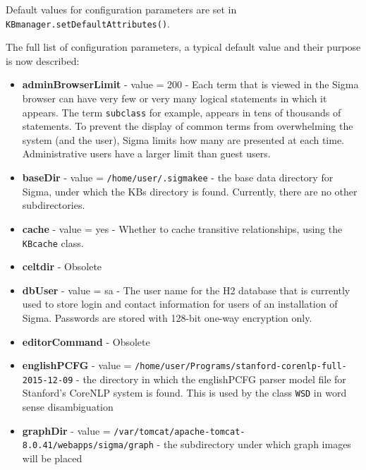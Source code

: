 \documentclass{book}
\begin{document}
\begin{sloppypar}
Default values for configuration parameters are set in 
\texttt{KBmanager.setDefaultAttributes()}.
\end{sloppypar}

The full list of configuration parameters, a typical default value and their
purpose is now described:

\begin{itemize}

\item \textbf{adminBrowserLimit} - value = 200 - Each term that is viewed in the
Sigma browser can have very few or very many logical statements in which it
appears.  The term \texttt{subclass} for example, appears in tens of thousands
of statements.  To prevent the display of common terms from overwhelming the
system (and the user), Sigma limits how many are presented at each time.
Administrative users have a larger limit than guest users.

\item \textbf{baseDir} - value = \texttt{/home/user/.sigmakee} - the base data
directory for Sigma, under which the KBs directory is found.  Currently, there
are no other subdirectories.

\item \textbf{cache} - value = yes - Whether to cache transitive relationships,
using the \texttt{KBcache} class.

\item \textbf{celtdir} - Obsolete

\item \textbf{dbUser} - value = sa - The user name for the H2 database that is
currently used to store login and contact information for users of an
installation of Sigma.  Passwords are stored with 128-bit one-way encryption
only.

\item \textbf{editorCommand}  - Obsolete

\item \textbf{englishPCFG} - value =
\texttt{/home/user/Programs/stanford-corenlp-full-2015-12-09} - the directory in
which the englishPCFG parser model file for Stanford's CoreNLP system is found.
This is used by the class \texttt{WSD} in word sense
disambiguation

\item \textbf{graphDir} - value =
\texttt{/var/tomcat/apache-tomcat-8.0.41/webapps/sigma/graph} - the subdirectory
under which graph images will be placed


\end{itemize}
\end{document}
